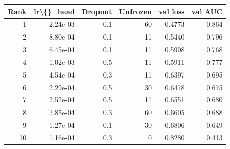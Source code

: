 \begin{tabular}{rrrrrr}
\toprule
\textbf{Rank} & \textbf{lr\textbackslash\{\}\_head} & \textbf{Dropout} & \textbf{Unfrozen} & \textbf{val loss} & \textbf{val AUC} \\
\midrule
1 & 2.24e-03 & 0.1 & 60 & 0.4773 & 0.864 \\
2 & 8.80e-04 & 0.1 & 11 & 0.5440 & 0.796 \\
3 & 6.45e-04 & 0.1 & 11 & 0.5908 & 0.768 \\
4 & 1.02e-03 & 0.5 & 11 & 0.5911 & 0.777 \\
5 & 4.54e-04 & 0.3 & 11 & 0.6397 & 0.695 \\
6 & 2.29e-04 & 0.5 & 30 & 0.6478 & 0.675 \\
7 & 2.52e-04 & 0.5 & 11 & 0.6551 & 0.680 \\
8 & 2.85e-04 & 0.3 & 60 & 0.6605 & 0.688 \\
9 & 1.27e-04 & 0.1 & 30 & 0.6806 & 0.649 \\
10 & 1.16e-04 & 0.3 & 0 & 0.8280 & 0.413 \\
\bottomrule
\end{tabular}
